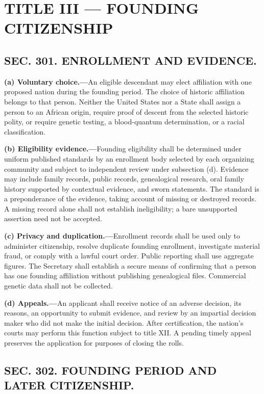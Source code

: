 \documentclass[12pt,letterpaper]{article}
\begin{document}
\section*{TITLE III --- FOUNDING CITIZENSHIP}

\subsection*{SEC. 301. ENROLLMENT AND EVIDENCE.}

\textbf{(a) Voluntary choice.---}An eligible descendant may elect affiliation with one proposed nation during the founding period. The choice of historic affiliation belongs to that person. Neither the United States nor a State shall assign a person to an African origin, require proof of descent from the selected historic polity, or require genetic testing, a blood-quantum determination, or a racial classification.

\textbf{(b) Eligibility evidence.---}Founding eligibility shall be determined under uniform published standards by an enrollment body selected by each organizing community and subject to independent review under subsection (d). Evidence may include family records, public records, genealogical research, oral family history supported by contextual evidence, and sworn statements. The standard is a preponderance of the evidence, taking account of missing or destroyed records. A missing record alone shall not establish ineligibility; a bare unsupported assertion need not be accepted.

\textbf{(c) Privacy and duplication.---}Enrollment records shall be used only to administer citizenship, resolve duplicate founding enrollment, investigate material fraud, or comply with a lawful court order. Public reporting shall use aggregate figures. The Secretary shall establish a secure means of confirming that a person has one founding affiliation without publishing genealogical files. Commercial genetic data shall not be collected.

\textbf{(d) Appeals.---}An applicant shall receive notice of an adverse decision, its reasons, an opportunity to submit evidence, and review by an impartial decision maker who did not make the initial decision. After certification, the nation's courts may perform this function subject to title XII. A pending timely appeal preserves the application for purposes of closing the rolls.

\subsection*{SEC. 302. FOUNDING PERIOD AND LATER CITIZENSHIP.}
\end{document}
